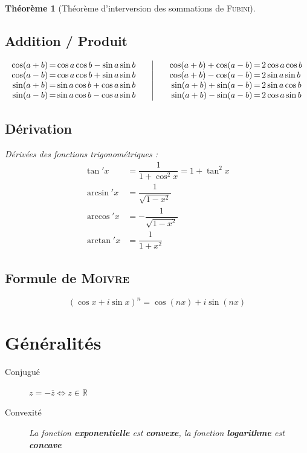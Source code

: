 \documentclass[11pt,a4paper]{report}
\newtheorem{theorem}{Théorème}[chapter]
\theoremstyle{definition}
\begin{document}
\begin{theorem}[Théorème d'interversion des sommations de \textsc{Fubini}]
{{\subsection{Addition / Produit}
\begin{equation}\label{trigo}
\begin{array}{r@{\, = \,}l @{\qquad}|@{\qquad} r@{\, = \,}l}
\cos (a+b) & \cos a \cos b - \sin a \sin b 
    & \cos (a+b) + \cos (a-b) & 2 \cos a \cos b \\
\cos (a-b) & \cos a \cos b + \sin a \sin b 
    & \cos (a+b) - \cos (a-b) & 2 \sin a \sin b \\
\sin (a+b) & \sin a \cos b + \cos a \sin b 
    & \sin (a+b) + \sin (a-b) & 2 \sin a \cos b \\
\sin (a-b) & \sin a \cos b - \cos a \sin b 
    & \sin (a+b) - \sin (a-b) & 2 \cos a \sin b
\end{array}
\end{equation}
\subsection{Dérivation} %
\label{sub:derivation_trigo}
Dérivées des fonctions trigonométriques : 
\begin{align*}
	 \tan' x 	&= \dfrac{1}{1 + \cos^2 x} = 1 + \tan^2 x \\
	 \arcsin' x &= \dfrac{1}{\sqrt{1 - x^2}} \\
	 \arccos' x &= -\dfrac{1}{\sqrt{1-x^2}} \\
	 \arctan' x &= \dfrac{1}{1+x^2}
\end{align*}

\subsection{Formule de \textsc{Moivre}} %
\label{sub:Moivre}
\begin{equation}
(\cos x + i \sin x)^n = \cos (nx) + i\sin (nx)
\end{equation}


\section*{Généralités}
\begin{description}
\item[Conjugué] $z = -\overline{z} \Leftrightarrow z \in \ensuremath{\mathbb{R}}$
\item[Convexité] La fonction \textbf{exponentielle} est \textbf{convexe}, la fonction \textbf{logarithme} est \textbf{concave}
\end{description}


}}
\end{theorem}
\end{document}
